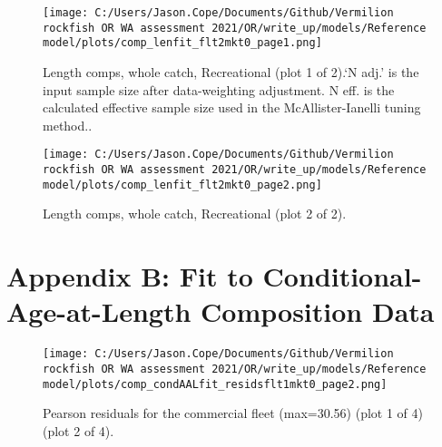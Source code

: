 \documentclass[11pt,
  english,
  a4paper,
]{article}
\begin{document}
\tagmcend\tagstructend


\begin{figure}
\centering
\texttt{[image: C:/Users/Jason.Cope/Documents/Github/Vermilion rockfish OR WA assessment 2021/OR/write\_up/models/Reference model/plots/comp\_lenfit\_flt2mkt0\_page1.png]}
\caption{Length comps, whole catch, Recreational (plot 1 of 2).`N adj.' is the input sample size after data-weighting adjustment. N eff. is the calculated effective sample size used in the McAllister-Ianelli tuning method..\label{fig:comp_lenfit_flt2mkt0_page1}}
\end{figure}

\tagmcend\tagstructend


\begin{figure}
\centering
\texttt{[image: C:/Users/Jason.Cope/Documents/Github/Vermilion rockfish OR WA assessment 2021/OR/write\_up/models/Reference model/plots/comp\_lenfit\_flt2mkt0\_page2.png]}
\caption{Length comps, whole catch, Recreational (plot 2 of 2).\label{fig:comp_lenfit_flt2mkt0_page2}}
\end{figure}

\tagmcend\tagstructend

\clearpage


\hypertarget{app-b}{%
\section{Appendix B: Fit to Conditional-Age-at-Length Composition Data}\label{app-b}}

\leavevmode\tagmcend\tagstructend


\begin{figure}
\centering
\texttt{[image: C:/Users/Jason.Cope/Documents/Github/Vermilion rockfish OR WA assessment 2021/OR/write\_up/models/Reference model/plots/comp\_condAALfit\_residsflt1mkt0\_page2.png]}
\caption{Pearson residuals for the commercial fleet (max=30.56) (plot 1 of 4) (plot 2 of 4).\label{fig:comp_condAALfit_residsflt1mkt0_page2}}
\end{figure}
\end{document}
